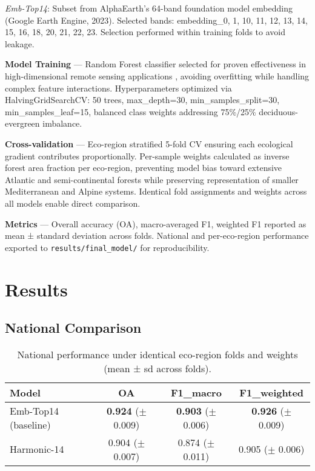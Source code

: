 \documentclass[utf8]{FrontiersinHarvard}
\begin{document}
\emph{Emb-Top14}: Subset from AlphaEarth's 64-band foundation model embedding (Google Earth Engine, 2023). Selected bands: embedding\_0, 1, 10, 11, 12, 13, 14, 15, 16, 18, 20, 21, 22, 23. Selection performed within training folds to avoid leakage.

\textbf{Model Training} — Random Forest classifier selected for proven effectiveness in high-dimensional remote sensing applications \citep{Belgiu2016}, avoiding overfitting while handling complex feature interactions. Hyperparameters optimized via HalvingGridSearchCV: 50 trees, max\_depth=30, min\_samples\_split=30, min\_samples\_leaf=15, balanced class weights addressing 75\%/25\% deciduous-evergreen imbalance.

\textbf{Cross-validation} — Eco-region stratified 5-fold CV ensuring each ecological gradient contributes proportionally. Per-sample weights calculated as inverse forest area fraction per eco-region, preventing model bias toward extensive Atlantic and semi-continental forests while preserving representation of smaller Mediterranean and Alpine systems. Identical fold assignments and weights across all models enable direct comparison.

\textbf{Metrics} — Overall accuracy (OA), macro-averaged F1, weighted F1 reported as mean ± standard deviation across folds. National and per-eco-region performance exported to \texttt{results/final\_model/} for reproducibility.

\section{Results}
\subsection{National Comparison}
\begin{table}[H]
    \centering
    \begin{tabular}{lccc}
        \hline
        \textbf{Model} & \textbf{OA} & \textbf{F1\_macro} & \textbf{F1\_weighted} \\ \hline
        Emb-Top14 (baseline) & \textbf{0.924} (\(\pm\) 0.009) & \textbf{0.903} (\(\pm\) 0.006) & \textbf{0.926} (\(\pm\) 0.009) \\
        Harmonic-14 & 0.904 (\(\pm\) 0.007) & 0.874 (\(\pm\) 0.011) & 0.905 (\(\pm\) 0.006) \\
        \hline
    \end{tabular}
    \caption{National performance under identical eco-region folds and weights (mean ± sd across folds).}
    \label{tab:national_comparison}
\end{table}
\end{document}
